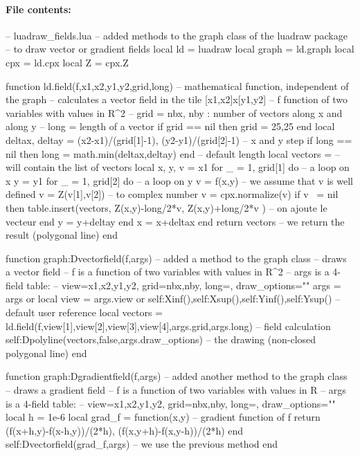 \paragraph{File contents:}
\begin{Luacode}
-- luadraw_fields.lua
-- added methods to the graph class of the luadraw package
-- to draw vector or gradient fields
local ld = luadraw
local graph = ld.graph
local cpx = ld.cpx
local Z = cpx.Z

function ld.field(f,x1,x2,y1,y2,grid,long)  -- mathematical function, independent of the graph
-- calculates a vector field in the tile [x1,x2]x[y1,y2]
-- f function of two variables with values ​​in R^2
-- grid = {nbx, nby} : number of vectors along x and along y
-- long = length of a vector
    if grid == nil then grid = {25,25} end
    local deltax, deltay = (x2-x1)/(grid[1]-1), (y2-y1)/(grid[2]-1) -- x and y step
    if long == nil then long = math.min(deltax,deltay) end -- default length
    local vectors = {} -- will contain the list of vectors
    local x, y, v = x1 
    for _ = 1, grid[1] do -- a loop on x
        y = y1
        for _ = 1, grid[2] do -- a loop on y
            v = f(x,y) -- we assume that v is well defined
            v = Z(v[1],v[2]) -- to complex number
            v = cpx.normalize(v)
            if v ~= nil then
                table.insert(vectors, {Z(x,y)-long/2*v, Z(x,y)+long/2*v} ) -- on ajoute le vecteur
            end
            y = y+deltay
        end
        x = x+deltax
    end
    return vectors -- we return the result (polygonal line)
end

function graph:Dvectorfield(f,args) -- added a method to the graph class
-- draws a vector field
-- f is a function of two variables with values ​​in R^2
-- args is a 4-field table:
-- { view={x1,x2,y1,y2}, grid={nbx,nby}, long=, draw_options=""}
    args = args or {}
    local view = args.view or {self:Xinf(),self:Xsup(),self:Yinf(),self:Ysup()} -- default user reference
    local vectors = ld.field(f,view[1],view[2],view[3],view[4],args.grid,args.long) -- field calculation
    self:Dpolyline(vectors,false,args.draw_options) -- the drawing (non-closed polygonal line)
end

function graph:Dgradientfield(f,args) -- added another method to the graph class
-- draws a gradient field
-- f is a function of two variables with values ​​in R
-- args is a 4-field table:
-- { view={x1,x2,y1,y2}, grid={nbx,nby}, long=, draw_options=""}
    local h = 1e-6
    local grad_f = function(x,y) -- gradient function of f
        return { (f(x+h,y)-f(x-h,y))/(2*h), (f(x,y+h)-f(x,y-h))/(2*h) }
    end
    self:Dvectorfield(grad_f,args) -- we use the previous method
end
\end{Luacode}

